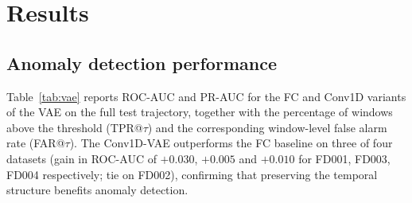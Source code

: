 \documentclass[5p,times,authoryear]{elsarticle}
\begin{document}
\section{Results}\label{sec:results}

\subsection{Anomaly detection performance}\label{sec:results-vae}

Table~\ref{tab:vae} reports ROC-AUC and PR-AUC for the FC and Conv1D variants of the VAE on the full test trajectory, together with the percentage of windows above the threshold (TPR@$\tau$) and the corresponding window-level false alarm rate (FAR@$\tau$). The Conv1D-VAE outperforms the FC baseline on three of four datasets (gain in ROC-AUC of $+0.030$, $+0.005$ and $+0.010$ for FD001, FD003, FD004 respectively; tie on FD002), confirming that preserving the temporal structure benefits anomaly detection.

\begin{table}[!t]
\centering
\caption{Window-level anomaly detection. Best in bold per dataset.}
\label{tab:vae}
\small
{}
\end{table}
\end{document}
